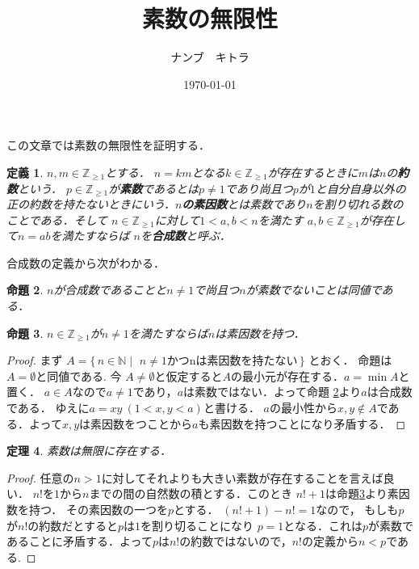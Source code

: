 \documentclass[leqno, a4paper, 12pt]{jsarticle}
\title{素数の無限性}
\author{ナンブ　キトラ}
\date{\today}
\newtheorem{thm}{定理}
\newtheorem{prop}[thm]{命題}
\newtheorem{df}[thm]{定義}
\newcommand{\zz}{\mathbb{Z}}
\begin{document}
\maketitle
この文章では素数の無限性を証明する．
\begin{df}
$n, m\in \zz_{\ge 1}$とする．
$n=km$となる$k\in \zz_{\ge 1}$が存在するときに$m$は$n$の\textbf{約数}という．
$p\in \zz_{\ge 1}$が\textbf{素数}であるとは$p\neq 1$であり尚且つ$p$が$1$と自分自身以外の正の約数を持たないときにいう．\textbf{$n$の素因数}とは素数であり$n$を割り切れる数のことである．そして
$n\in \zz_{\ge 1}$に対して$1<a, b<n$を満たす
$a, b\in \zz_{\ge 1}$が存在して$n=ab$を満たすならば
$n$を\textbf{合成数}と呼ぶ．
\end{df}
合成数の定義から次がわかる．
\begin{prop}\label{nab}
$n$が合成数であることと$n\neq 1$で尚且つ$n$が素数でないことは同値である．
\end{prop}

\begin{prop}\label{soinsuu}
$n\in \zz_{\ge 1}$が$n\neq 1$を満たすならば$n$は素因数を持つ．
\end{prop}
\begin{proof}
まず
$A =\{\,  n\in \mathbb{N} 
\mid 
\text{
 $n\neq1$かつnは素因数を持たない}
 \, \}$
とおく．
命題は$A= \emptyset$と同値である.
今
$A\neq \emptyset$と仮定すると$A$の最小元が存在する．$a=\min A$と置く．
$a\in A$なので$a\neq 1$であり，$a$は素数ではない．よって命題 \ref{nab}より$a$は合成数である．
ゆえに$a=xy\ (1<x,y<a)$と書ける．
$a$の最小性から$x,y\not\in A$である．よって$x,y$は素因数をつことから$a$も素因数を持つことになり矛盾する．
\end{proof}


\begin{thm}
素数は無限に存在する．
\end{thm}
\begin{proof}
任意の$n>1$に対してそれよりも大きい素数が存在することを言えば良い．
$n!$を$1$から$n$までの間の自然数の積とする．このとき
$n!+1$は命題\ref{soinsuu}より素因数を持つ．
その素因数の一つを$p$とする．
$(n!+1)-n!=1$なので，
もしも$p$が$n!$の約数だとすると$p$は$1$を割り切ることになり
$p=1$となる．これは$p$が素数であることに矛盾する．よって$p$は$n!$の約数ではないので，$n!$の定義から$n<p$である.
\end{proof}
\end{document}
